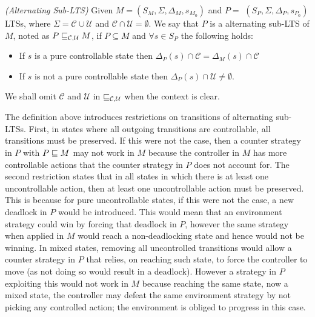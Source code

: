 \begin{definition}\label{def:nonreal-legalEnvironment}\emph{(Alternating Sub-LTS)}
Given $M = (S_M, \Sigma, \Delta_M, s_{M_0})$ and
 $P =$ $(S_P,\Sigma,\Delta_P,s_{P_0})$ LTSs, 
where $\Sigma =\mathcal{C}\cup \mathcal{U}$ and $\mathcal{C}\cap
\mathcal{U}=\emptyset$. We say that $P$ is a alternating
 sub-LTS of $M$, noted as $P \sqsubseteq_{\mathcal{C},\mathcal{U}} M$, if  $P \subseteq M$  and $\forall s \in S_{P}$ the following holds:
 \begin{itemize}
\item If $s$ is a pure controllable state then $\Delta_{P}(s) \cap \mathcal{C} = \Delta_{M}(s) \cap \mathcal{C} $
\item If $s$ is not a pure controllable state then  
$\Delta_{P}(s) \cap \mathcal{U} \neq \emptyset$.
 \end{itemize}
 
We shall omit $\mathcal{C}$ and $\mathcal{U}$ in $\sqsubseteq_{\mathcal{C},\mathcal{U}}$ when the context is clear. 
 \end{definition}

The definition above introduces  restrictions on transitions of alternating sub-LTSs. 
First, in states where all outgoing transitions are controllable, all transitions must be preserved. 
If this were not the case, then a counter strategy in $P$ with $P \sqsubseteq M$ may not work in $M$ because the controller in $M$ has more controllable actions that the counter strategy in $P$ does not account for. 
The second restriction states that in all states in which there is at least one uncontrollable action, then at least one uncontrollable action must be preserved. This is because for pure uncontrollable states, if this were not the case, a new deadlock in $P$ would be introduced. This would mean that an environment strategy could win by forcing that deadlock in $P$, however the same strategy when applied in $M$ would reach a non-deadlocking state and hence would not be winning. In mixed states, removing all uncontrolled transitions would allow a counter strategy in $P$ that relies, on reaching such state, to force the controller to move (as not doing so would result in a deadlock). However a strategy in $P$ exploiting this would not work in $M$ because reaching the same state, now a mixed state, the controller may defeat the same environment strategy by not picking any controlled action; the environment is obliged to progress in this case. 


